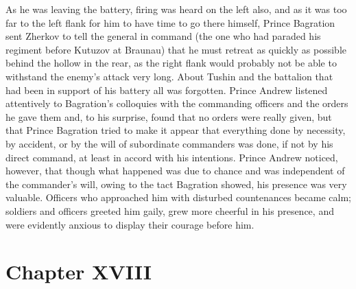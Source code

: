 As he was leaving the battery, firing was heard on the left also,
and as it was too far to the left flank for him to have time to
go there himself, Prince Bagration sent Zherkov to tell the
general in command (the one who had paraded his regiment before
Kutuzov at Braunau) that he must retreat as quickly as possible
behind the hollow in the rear, as the right flank would probably
not be able to withstand the enemy's attack very long. About
Tushin and the battalion that had been in support of his battery
all was forgotten. Prince Andrew listened attentively to
Bagration's colloquies with the commanding officers and the
orders he gave them and, to his surprise, found that no orders
were really given, but that Prince Bagration tried to make it
appear that everything done by necessity, by accident, or by the
will of subordinate commanders was done, if not by his direct
command, at least in accord with his intentions. Prince Andrew
noticed, however, that though what happened was due to chance and
was independent of the commander's will, owing to the tact
Bagration showed, his presence was very valuable.  Officers who
approached him with disturbed countenances became calm; soldiers
and officers greeted him gaily, grew more cheerful in his
presence, and were evidently anxious to display their courage
before him.


\chapter*{Chapter XVIII}
\ifaudio     {} \fi

